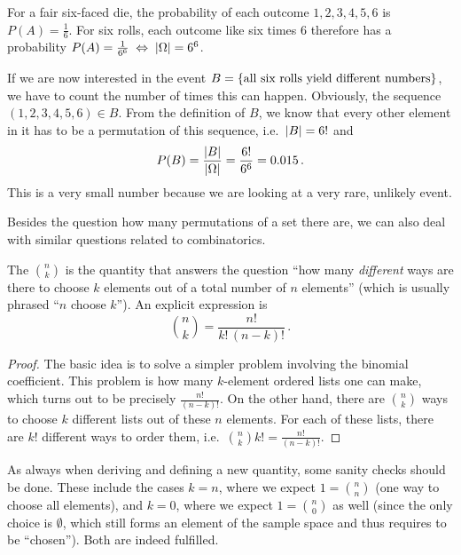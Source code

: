 \begin{ex}
For a fair six-faced die, the probability of each outcome $1, 2, 3, 4, 5, 6$ is $P(A) = \frac{1}{6}$. For six rolls, each outcome like six times $6$ therefore has a probability $P(A) = \frac{1}{6^6} \; \Leftrightarrow \; \abs{\Omega} = 6^6$.

If we are now interested in the event $B = \qty{\text{all six rolls yield different numbers}}$, we have to count the number of times this can happen. Obviously, the sequence $(1, 2, 3, 4, 5, 6) \in B$. From the definition of $B$, we know that every other element in it has to be a permutation of this sequence, i.e.~$\abs{B} = 6!$ and
\begin{equation*}
P(B) = \frac{\abs{B}}{\abs{\Omega}} = \frac{6!}{6^6} = 0.015 \, .
\end{equation*}
This is a very small number because we are looking at a very rare, unlikely event.
\end{ex}


Besides the question how many permutations of a set there are, we can also deal with similar questions related to combinatorics.


\begin{defi}
The  $\binom{n}{k}$ is the quantity that answers the question \enquote{how many \emph{different} ways are there to choose $k$ elements out of a total number of $n$ elements} (which is usually phrased \enquote{$n$ choose $k$}). An explicit expression is
\begin{equation}
\binom{n}{k} = \frac{n!}{k! \, (n - k)!} \, .
\end{equation}
\end{defi}

\begin{proof}
The basic idea is to solve a simpler problem involving the binomial coefficient. This problem is how many $k$-element ordered lists one can make, which turns out to be precisely $\frac{n!}{(n - k)!}$. On the other hand, there are $\binom{n}{k}$ ways to choose $k$ different lists out of these $n$ elements. For each of these lists, there are $k!$ different ways to order them, i.e.~$\binom{n}{k} k! = \frac{n!}{(n - k)!}$.
\end{proof}


As always when deriving and defining a new quantity, some sanity checks should be done. These include the cases $k = n$, where we expect $1 = \binom{n}{n}$ (one way to choose all elements), and $k = 0$, where we expect $1 = \binom{n}{0}$ as well (since the only choice is $\emptyset$, which still forms an element of the sample space and thus requires to be \enquote{chosen}). Both are indeed fulfilled.


